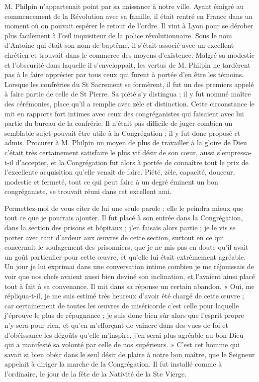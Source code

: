 M. Philpin n'appartenait point par sa naissance à notre ville. Ayant émigré au commencement de la Révolution avec sa famille, il était rentré en France dans un moment où on pouvait espérer le retour de l'ordre. Il vint à Lyon pour se dérober plus facilement à l'œil inquisiteur de la police révolutionnaire. Sous le nom d'Antoine qui était son nom de baptême, il s'était associé avec un excellent chrétien et trouvait dans le commerce des moyens d'existence. Malgré sa modestie et l'obscurité dans laquelle il s'enveloppait, les vertus de M. Philpin ne tardèrent pas à le faire apprécier par tous ceux qui furent à portée d'en être les témoins. Lorsque les confréries du St Sacrement se formèrent, il fut un des premiers appelé à faire partie de celle de St Pierre. Sa piété s'y distingua ; il y fut nommé maître des cérémonies, place qu'il a remplie avec zèle et distinction. Cette circonstance le mit en rapports fort intimes avec ceux des congréganistes qui faisaient avec lui partie du bureau de la confrérie. Il n'était pas difficile
de juger combien un semblable sujet pouvait être utile à la Congrégation ; il y fut donc proposé et admis. Procurer à M. Philpin un moyen de plus de travailler à la gloire de Dieu c'était très certainement satisfaire le plus vif désir de son cœur, aussi s'empressa-t-il d'accepter, et la Congrégation fut alors à portée de connaître tout le prix de l'excellente acquisition qu'elle venait de faire. Piété, zèle, capacité, douceur, modestie et fermeté, tout ce qui peut faire à un degré éminent un bon congréganiste, se trouvait réuni dans cet excellent ami.

Permettez-moi de vous citer de lui une seule parole ; elle le peindra mieux que tout ce que je pourrais ajouter. Il fut placé à son entrée dans la Congrégation, dans la section des prisons et hôpitaux ; j'en faisais alors partie ; je le vis se porter avec tant d'ardeur aux œuvres de cette section, surtout en ce qui concernait le soulagement des prisonniers, que je ne mis pas en doute qu'il avait un goût particulier pour cette œuvre, et qu'elle lui était extrêmement agréable. Un jour je lui exprimai dans une conversation intime combien je me réjouissais de voir que nos chefs avaient aussi bien deviné son inclination, et l'avaient ainsi placé tout à fait à sa convenance. Il mit dans sa réponse un certain abandon. « Oui, me répliqua-t-il, je me suis estimé très heureux d'avoir été chargé de cette œuvre ; car certainement de toutes les œuvres de miséricorde c'est celle pour laquelle j'éprouve le plus de répugnance ; je suis donc bien sûr alors que l'esprit propre n'y sera pour rien, et qu'en m'efforçant de vaincre dans des vues de foi et d'obéissance les dégoûts qu'elle m'inspire, j'en serai plus agréable au bon Dieu qui a manifesté sa volonté par celle de nos supérieurs. » C'est cet homme qui savait si bien obéir dans le seul désir de plaire à notre bon
maître, que le Seigneur appelait à diriger la marche de la Congrégation. Il fut installé comme à l'ordinaire, le jour de la fête de la Nativité de la Ste Vierge.

